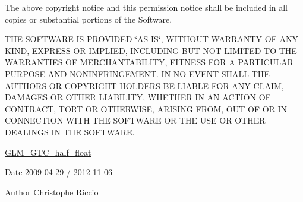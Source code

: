 The above copyright notice and this permission notice shall be included in all copies or substantial portions of the Software.

T\+H\+E S\+O\+F\+T\+W\+A\+R\+E I\+S P\+R\+O\+V\+I\+D\+E\+D \char`\"{}\+A\+S I\+S\char`\"{}, W\+I\+T\+H\+O\+U\+T W\+A\+R\+R\+A\+N\+T\+Y O\+F A\+N\+Y K\+I\+N\+D, E\+X\+P\+R\+E\+S\+S O\+R I\+M\+P\+L\+I\+E\+D, I\+N\+C\+L\+U\+D\+I\+N\+G B\+U\+T N\+O\+T L\+I\+M\+I\+T\+E\+D T\+O T\+H\+E W\+A\+R\+R\+A\+N\+T\+I\+E\+S O\+F M\+E\+R\+C\+H\+A\+N\+T\+A\+B\+I\+L\+I\+T\+Y, F\+I\+T\+N\+E\+S\+S F\+O\+R A P\+A\+R\+T\+I\+C\+U\+L\+A\+R P\+U\+R\+P\+O\+S\+E A\+N\+D N\+O\+N\+I\+N\+F\+R\+I\+N\+G\+E\+M\+E\+N\+T. I\+N N\+O E\+V\+E\+N\+T S\+H\+A\+L\+L T\+H\+E A\+U\+T\+H\+O\+R\+S O\+R C\+O\+P\+Y\+R\+I\+G\+H\+T H\+O\+L\+D\+E\+R\+S B\+E L\+I\+A\+B\+L\+E F\+O\+R A\+N\+Y C\+L\+A\+I\+M, D\+A\+M\+A\+G\+E\+S O\+R O\+T\+H\+E\+R L\+I\+A\+B\+I\+L\+I\+T\+Y, W\+H\+E\+T\+H\+E\+R I\+N A\+N A\+C\+T\+I\+O\+N O\+F C\+O\+N\+T\+R\+A\+C\+T, T\+O\+R\+T O\+R O\+T\+H\+E\+R\+W\+I\+S\+E, A\+R\+I\+S\+I\+N\+G F\+R\+O\+M, O\+U\+T O\+F O\+R I\+N C\+O\+N\+N\+E\+C\+T\+I\+O\+N W\+I\+T\+H T\+H\+E S\+O\+F\+T\+W\+A\+R\+E O\+R T\+H\+E U\+S\+E O\+R O\+T\+H\+E\+R D\+E\+A\+L\+I\+N\+G\+S I\+N T\+H\+E S\+O\+F\+T\+W\+A\+R\+E.

\hyperlink{group__gtc__half__float}{G\+L\+M\+\_\+\+G\+T\+C\+\_\+half\+\_\+float}

\begin{DoxyDate}{Date}
2009-\/04-\/29 / 2012-\/11-\/06 
\end{DoxyDate}
\begin{DoxyAuthor}{Author}
Christophe Riccio 
\end{DoxyAuthor}
